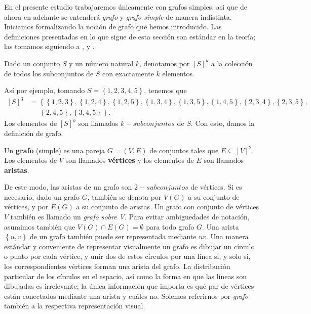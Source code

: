 En el presente estudio trabajaremos únicamente con grafos simples, así que de ahora en adelante se entenderá \textit{grafo} y \textit{grafo simple} de manera indistinta. Iniciamos formalizando la noción de grafo que hemos introducido. Las definiciones presentadas en lo que sigue de esta sección son estándar en la teoría; las tomamos siguiendo a \cite{diestel2017}, \cite{gomez2025} y \cite{jafarian2013}.
\begin{Not}
Dado un conjunto $S$ y un número natural $k$, denotamos por $[S]^k$ a la colección de todos los subconjuntos de $S$ con exactamente $k$ elementos.
\end{Not}
Así por ejemplo, tomando $S=\left\lbrace 1,2,3,4,5 \right\rbrace$, tenemos que 
$$
\begin{aligned}
   [S]^3 &= \left\lbrace \left\lbrace 1,2,3\right\rbrace, \left\lbrace 1,2,4\right\rbrace, \left\lbrace 1,2,5\right\rbrace, \left\lbrace 1,3,4\right\rbrace, \left\lbrace 1,3,5\right\rbrace, \left\lbrace 1,4,5\right\rbrace, \left\lbrace 2,3,4\right\rbrace, \left\lbrace 2,3,5\right\rbrace \right.,\\
         &\phantom{ooo} \left. \left\lbrace 2,4,5\right\rbrace, \left\lbrace 3,4,5\right\rbrace\right\rbrace. 
\end{aligned}
$$
Los elementos de $[S]^k$ son llamados $k-subconjuntos$ de $S$. Con esto, damos la definición de grafo.
\begin{Def}
   Un \textbf{grafo} (simple) es una pareja $G=\left( V,E\right)$ de conjuntos tales que $E\subseteq [V]^2$. Los elementos de $V$ son llamados \textbf{vértices} y los elementos de $E$ son llamados \textbf{aristas}.
\end{Def}
De este modo, las aristas de un grafo son $2-subconjuntos$ de vértices. Si es necesario, dado un grafo $G$, también se denota por $V(G)$ a su conjunto de vértices, y por $E(G)$ a su conjunto de aristas. Un grafo con conjunto de vértices $V$ también es llamado un \textit{grafo sobre V}. Para evitar ambiguedades de notación, asumimos también que $V(G)\cap E(G)=\emptyset$ para todo grafo $G$. Una arista $\left\lbrace u,v\right\rbrace$ de un grafo también puede ser representada mediante $uv$. Una manera estándar y conveniente de representar visualmente un grafo es dibujar un círculo o punto por cada vértice, y unir dos de estos círculos por una línea si, y solo si, los correspondientes vértices forman una arista del grafo. La distribución particular de los círculos en el espacio, así como la forma en que las líneas son dibujadas es irrelevante; la única información que importa es qué par de vértices están conectados mediante una arista y cuáles no. Solemos referirnos por \textit{grafo} también a la respectiva representación visual.
